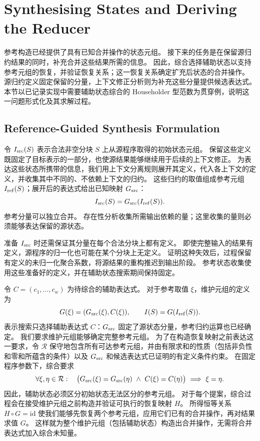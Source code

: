 \section{Synthesising States and Deriving the Reducer}
\label{sec:derivation}

参考构造已经提供了具有已知合并操作的状态元组。
接下来的任务是在保留源归约结果的同时，补充合并这些结果所需的信息。
因此，综合选择辅助状态以支持参考元组的恢复，并验证恢复关系；这一恢复关系确定扩充后状态的合并操作。
源归约定义固定保留的分量，上下文修正分析则为补充这些分量提供候选表达式。
本节以已记录实现中需要辅助状态综合的 Householder 型范数为贯穿例，说明这一问题形式化及其求解过程。

\subsection{Reference-Guided Synthesis Formulation}
\label{sec:selection}

令 $I_{\mathrm{src}}(S)$ 表示合法非空分块 $S$ 上从源程序取得的初始状态元组。
保留这些定义既固定了目标表示的一部分，也使源结果能够继续用于后续的上下文修正。
为表达这些状态所携带的信息，我们用上下文分离规则展开其定义，代入各上下文的定义，并收集其中不同的、不依赖上下文的归约。
这些归约的取值组成参考元组 $I_{\mathrm{ref}}(S)$；展开后的表达式给出已知映射 $G_{\mathrm{src}}$：
\begin{equation}
\label{eq:source-reference}
I_{\mathrm{src}}(S)=G_{\mathrm{src}}(I_{\mathrm{ref}}(S)).
\end{equation}
参考分量可以独立合并。
存在性分析收集所需输出依赖的量；这里收集的量则必须能够表达保留的源状态。

准备 $I_{\mathrm{src}}$ 时还需保证其分量在每个合法分块上都有定义。
即使完整输入的结果有定义，源程序的归一化也可能在某个分块上无定义。
证明这种失效后，过程保留有定义的未归一化聚合系数，将源结果的重构推迟到输出阶段。
参考状态收集使用这些准备好的定义，并在辅助状态搜索期间保持固定。

令 $C=(c_1,\ldots,c_w)$ 为待综合的辅助表达式。
对于参考取值 $\xi$，维护元组的定义为
\[
G(\xi)=(G_{\mathrm{src}}(\xi),C(\xi)),\qquad
I(S)=G(I_{\mathrm{ref}}(S)).
\]
表示搜索只选择辅助表达式 $C$：$G_{\mathrm{src}}$ 固定了源状态分量，参考归约运算也已经确定。
我们要求维护元组能够确定完整参考元组。
为了在构造恢复映射之前表达这一要求，令 $\mathcal R$ 保守地包含所有可达参考元组，并由有限求和的性质（包括非负性和零和所蕴含的条件）以及 $G_{\mathrm{src}}$ 和候选表达式已证明的有定义条件约束。
在固定程序参数下，综合要求
\begin{equation}
\label{eq:synthesis}
\forall \xi,\eta\in\mathcal R:\quad
\bigl(G_{\mathrm{src}}(\xi)=G_{\mathrm{src}}(\eta)\ \land\ C(\xi)=C(\eta)\bigr)
\ \Longrightarrow\ \xi=\eta.
\end{equation}
因此，辅助状态必须区分初始状态无法区分的参考元组。
对于每个提案，综合过程会在接受维护元组之前构造并验证可执行的恢复映射 $H$。
所得恒等关系 $H\circ G=\mathrm{id}$ 使我们能够先恢复两个参考元组，应用它们已有的合并操作，再对结果求值 $G$。
这样就为整个维护元组（包括辅助状态）构造出合并操作，无需将合并表达式加入综合未知量。

